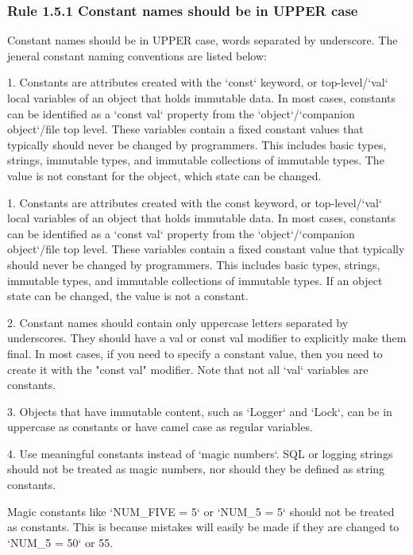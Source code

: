 \subsubsection*{\textbf{Rule 1.5.1 Constant names should be in UPPER case}}
\leavevmode\newline

Constant names should be in UPPER case, words separated by underscore. The jeneral constant naming conventions are listed below:

1. Constants are attributes created with the `const` keyword, or top-level/`val` local variables of an object that holds immutable data. In most cases, constants can be identified as a `const val` property from the `object`/`companion object`/file top level. These variables contain a fixed constant values that typically should never be changed by programmers. This includes basic types, strings, immutable types, and immutable collections of immutable types. The value is not constant for the object, which state can be changed.



1. Constants are attributes created with the const keyword, or top-level/`val` local variables of an object that holds immutable data. In most cases, constants can be identified as a `const val` property from the `object`/`companion object`/file top level. These variables contain a fixed constant value that typically should never be changed by programmers. This includes basic types, strings, immutable types, and immutable collections of immutable types. If an object state can be changed, the value is not a constant.



2. Constant names should contain only uppercase letters separated by underscores. They should have a val or const val modifier to explicitly make them final. In most cases, if you need to specify a constant value, then you need to create it with the "const val" modifier. Note that not all `val` variables are constants.

3. Objects that have immutable content, such as `Logger` and `Lock`, can be in uppercase as constants or have camel case as regular variables.



4. Use meaningful constants instead of `magic numbers`. SQL or logging strings should not be treated as magic numbers, nor should they be defined as string constants.

Magic constants like `NUM_FIVE = 5` or `NUM_5 = 5` should not be treated as constants. This is because mistakes will easily be made if they are changed to `NUM_5 = 50` or 55.

